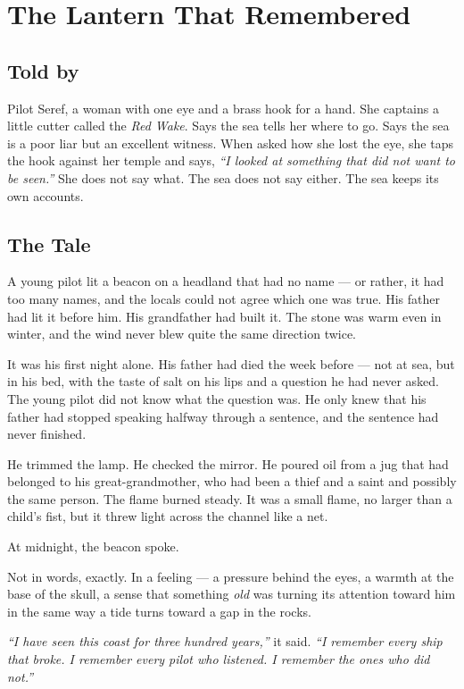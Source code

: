\chapter{The Lantern That Remembered}

\section*{Told by}
Pilot Seref, a woman with one eye and a brass hook for a hand. She captains a little cutter called the \textit{Red Wake}. Says the sea tells her where to go. Says the sea is a poor liar but an excellent witness. When asked how she lost the eye, she taps the hook against her temple and says, \textit{``I looked at something that did not want to be seen.''} She does not say what. The sea does not say either. The sea keeps its own accounts.

\section*{The Tale}

A young pilot lit a beacon on a headland that had no name --- or rather, it had too many names, and the locals could not agree which one was true. His father had lit it before him. His grandfather had built it. The stone was warm even in winter, and the wind never blew quite the same direction twice.

It was his first night alone. His father had died the week before --- not at sea, but in his bed, with the taste of salt on his lips and a question he had never asked. The young pilot did not know what the question was. He only knew that his father had stopped speaking halfway through a sentence, and the sentence had never finished.

He trimmed the lamp. He checked the mirror. He poured oil from a jug that had belonged to his great-grandmother, who had been a thief and a saint and possibly the same person. The flame burned steady. It was a small flame, no larger than a child's fist, but it threw light across the channel like a net.

At midnight, the beacon spoke.

Not in words, exactly. In a feeling --- a pressure behind the eyes, a warmth at the base of the skull, a sense that something \textit{old} was turning its attention toward him in the same way a tide turns toward a gap in the rocks.

\textit{``I have seen this coast for three hundred years,''} it said. \textit{``I remember every ship that broke. I remember every pilot who listened. I remember the ones who did not.''}

